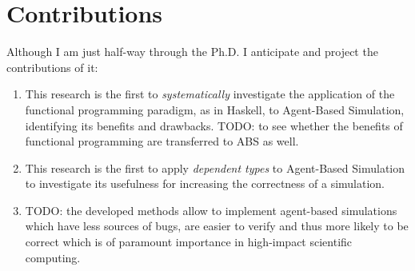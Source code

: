 \section{Contributions}
\label{sect:contib}
Although I am just half-way through the Ph.D. I anticipate and project the contributions of it:

\begin{enumerate}
	\item This research is the first to \textit{systematically} investigate the application of the functional programming paradigm, as in Haskell, to Agent-Based Simulation, identifying its benefits and drawbacks. TODO: to see whether the benefits of functional programming are transferred to ABS as well.
	\item This research is the first to apply \textit{dependent types} to Agent-Based Simulation to investigate its usefulness for increasing the correctness of a simulation.
	\item TODO: the developed methods allow to implement agent-based simulations which have less sources of bugs, are easier to verify and thus more likely to be correct which is of paramount importance in high-impact scientific computing. 
\end{enumerate}